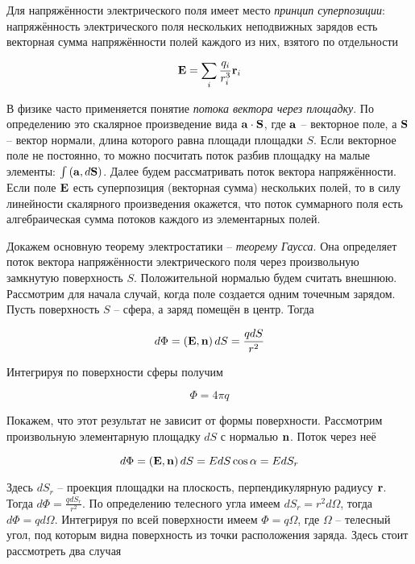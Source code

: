 Для напряжённости электрического поля имеет место \textit{принцип суперпозиции}: напряжённость электрического поля нескольких неподвижных зарядов есть векторная сумма напряжённости полей каждого из них, взятого по отдельности

\begin{equation}
    \mathbf E = \sum_i \frac{q_i}{r_i^3} \mathbf r_i
\end{equation}

В физике часто применяется понятие \textit{потока вектора через площадку}. По определению это скалярное произведение вида $\mathbf a \cdot \mathbf S$, где $\mathbf a$ -- векторное поле, а $\mathbf S$ -- вектор нормали, длина которого равна площади площадки $S$. Если векторное поле не постоянно, то можно посчитать поток разбив площадку на малые элементы: $\int \left( \mathbf a, d \mathbf S \right)$. Далее будем рассматривать поток вектора напряжённости. Если поле $\mathbf E$ есть суперпозиция (векторная сумма) нескольких полей, то в силу линейности скалярного произведения окажется, что поток суммарного поля есть алгебраическая сумма потоков каждого из элементарных полей.

Докажем основную теорему электростатики -- \textit{теорему Гаусса}. Она определяет поток вектора напряжённости электрического поля через произвольную замкнутую поверхность $S$. Положительной нормалью будем считать внешнюю. Рассмотрим для начала случай, когда поле создается одним точечным зарядом. Пусть поверхность $S$ -- сфера, а заряд помещён в центр. Тогда

\begin{equation*}
    d \Phi = \left( \mathbf E, \mathbf n \right) dS = \frac{q dS}{r^2}
\end{equation*}

\noindent
Интегрируя по поверхности сферы получим

\begin{equation} \label{eq:поток E}
    \Phi = 4 \pi q
\end{equation}

\noindent
Покажем, что этот результат не зависит от формы поверхности. Рассмотрим произвольную элементарную площадку $dS$ с нормалью $\mathbf n$. Поток через неё

\begin{equation*}
    d \Phi = \left( \mathbf E, \mathbf n \right) dS = E dS \cos \alpha = E dS_r
\end{equation*}

Здесь $dS_r$ -- проекция площадки на плоскость, перпендикулярную радиусу $\mathbf r$. Тогда $d \Phi = \frac{q dS_r}{r^2}$. По определению телесного угла имеем $dS_r = r^2 d \Omega$, тогда $d \Phi = q d \Omega$. Интегрируя по всей поверхности имеем $\Phi = q \Omega$, где $\Omega$ -- телесный угол, под которым видна поверхность из точки расположения заряда. Здесь стоит рассмотреть два случая

